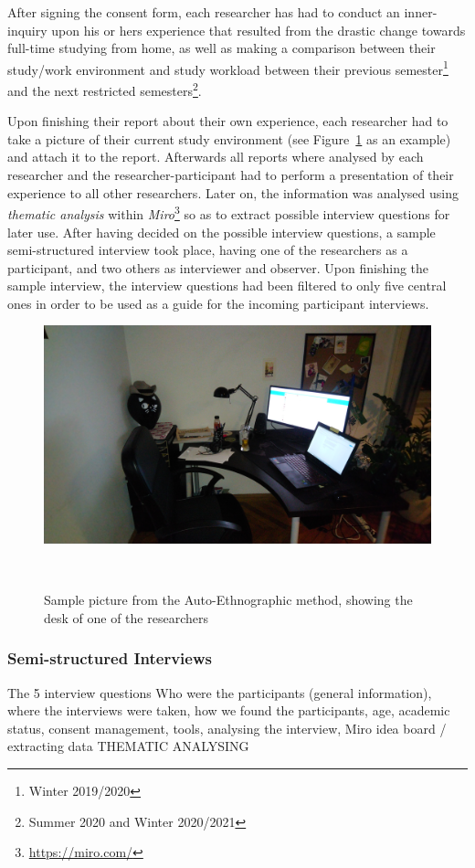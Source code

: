 \documentclass{sigchi}
\begin{document}
After signing the consent form, each researcher has had to conduct an inner-inquiry upon his or hers experience that resulted from the drastic change towards full-time studying from home, as well as making a comparison between their study/work environment and study workload between their previous semester\footnote{Winter 2019/2020} and the next restricted semesters\footnote{Summer 2020 and Winter 2020/2021}.

Upon finishing their report about their own experience, each researcher had to take a picture of their current study environment (see Figure~\ref{fig:figure1} as an example) and attach it to the report. Afterwards all reports where analysed by each researcher and the  researcher-participant had to perform a presentation of their experience to all other researchers. Later on, the information was analysed using \emph{thematic analysis} within \emph{Miro}\footnote{\url{https://miro.com/}} so as to extract possible interview questions for later use. After having decided on the possible interview questions, a sample semi-structured interview took place, having one of the researchers as a participant, and two others as interviewer and observer. Upon finishing the sample interview, the interview questions had been filtered to only five central ones in order to be used as a guide for the incoming participant interviews.
\begin{figure}
\centering
  \includegraphics[width=1\columnwidth]{figures/auto-e-picture}
  \caption{Sample picture from the Auto-Ethnographic method, showing the desk of one of the researchers}~\label{fig:figure1}
\end{figure}

\subsubsection{Semi-structured Interviews}
The 5 interview questions
Who were the participants (general information), where the interviews were taken, how we found the participants, age, academic status, consent management, tools, analysing the interview, Miro idea board / extracting data THEMATIC ANALYSING 
\end{document}

